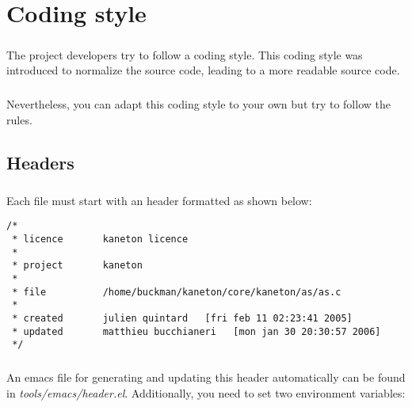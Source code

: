 
%
%

\chapter{Coding style}

\newpage

\paragraph{}
The \kaneton  project developers  try to follow  a coding  style. This
coding style was introduced to normalize the source code, leading to a
more readable source code.

\paragraph{}
Nevertheless, you  can adapt this coding  style to your own  but try to
follow the rules.

\section*{Headers}

\paragraph{}
Each file must start with an header formatted as shown below:

\begin{verbatim}
/*
 * licence       kaneton licence
 *
 * project       kaneton
 *
 * file          /home/buckman/kaneton/core/kaneton/as/as.c
 *
 * created       julien quintard   [fri feb 11 02:23:41 2005]
 * updated       matthieu bucchianeri   [mon jan 30 20:30:57 2006]
 */
\end{verbatim}

\paragraph{}
An emacs  file for generating  and updating this  header automatically
can be found in \textit{tools/emacs/header.el}. Additionally, you need
to set two environment variables:

